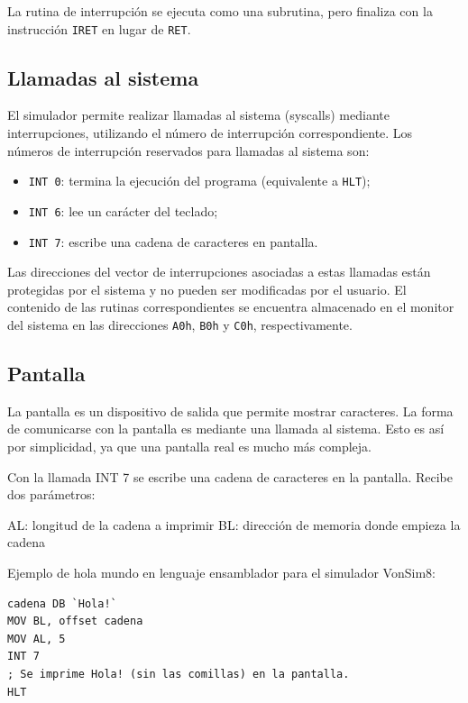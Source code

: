 \documentclass[12pt,oneside]{templates/unerthesis}
\providecommand{\tightlist}{%
  \setlength{\itemsep}{0pt}\setlength{\parskip}{0pt}}
\begin{document}
La rutina de interrupción se ejecuta como una subrutina, pero finaliza con la instrucción \texttt{IRET} en lugar de \texttt{RET}.

\hypertarget{llamadas-al-sistema}{%
\subsection{Llamadas al sistema}\label{llamadas-al-sistema}}

El simulador permite realizar llamadas al sistema (syscalls) mediante interrupciones, utilizando el número de interrupción correspondiente. Los números de interrupción reservados para llamadas al sistema son:

\begin{itemize}
\tightlist
\item
  \texttt{INT\ 0}: termina la ejecución del programa (equivalente a \texttt{HLT});
\item
  \texttt{INT\ 6}: lee un carácter del teclado;
\item
  \texttt{INT\ 7}: escribe una cadena de caracteres en pantalla.
\end{itemize}

Las direcciones del vector de interrupciones asociadas a estas llamadas están protegidas por el sistema y no pueden ser modificadas por el usuario. El contenido de las rutinas correspondientes se encuentra almacenado en el monitor del sistema en las direcciones \texttt{A0h}, \texttt{B0h} y \texttt{C0h}, respectivamente.

\hypertarget{pantalla}{%
\subsection{Pantalla}\label{pantalla}}

La pantalla es un dispositivo de salida que permite mostrar caracteres. La forma de comunicarse con la pantalla es mediante una llamada al sistema. Esto es así por simplicidad, ya que una pantalla real es mucho más compleja.

Con la llamada INT 7 se escribe una cadena de caracteres en la pantalla. Recibe dos parámetros:

AL: longitud de la cadena a imprimir
BL: dirección de memoria donde empieza la cadena

Ejemplo de hola mundo en lenguaje ensamblador para el simulador VonSim8:

\begin{lstlisting}
cadena DB `Hola!`
MOV BL, offset cadena
MOV AL, 5
INT 7
; Se imprime Hola! (sin las comillas) en la pantalla.
HLT\end{lstlisting}
\end{document}
